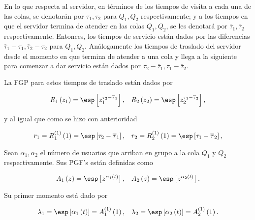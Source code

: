 En lo que respecta al servidor, en t\'erminos de los tiempos de
visita a cada una de las colas, se denotar\'an por
$\tau_{1},\tau_{2}$ para $Q_{1},Q_{2}$ respectivamente; y a los
tiempos en que el servidor termina de atender en las colas
$Q_{1},Q_{2}$, se les denotar\'a por
$\overline{\tau}_{1},\overline{\tau}_{2}$ respectivamente.
Entonces, los tiempos de servicio est\'an dados por las
diferencias
$\overline{\tau}_{1}-\tau_{1},\overline{\tau}_{2}-\tau_{2}$ para
$Q_{1},Q_{2}$. An\'alogamente los tiempos de traslado del servidor
desde el momento en que termina de atender a una cola y llega a la
siguiente para comenzar a dar servicio est\'an dados por
$\tau_{2}-\overline{\tau}_{1},\tau_{1}-\overline{\tau}_{2}$.


La FGP para estos tiempos de traslado est\'an dados por

\begin{eqnarray*}
\begin{array}{cc}
R_{1}\left(z_{1}\right)=\esp\left[z_{1}^{\tau_{2}-\overline{\tau}_{1}}\right],
&
R_{2}\left(z_{2}\right)=\esp\left[z_{2}^{\tau_{1}-\overline{\tau}_{2}}\right],
\end{array}
\end{eqnarray*}

y al igual que como se hizo con anterioridad

\begin{eqnarray*}
\begin{array}{cc}
r_{1}=R_{1}^{(1)}\left(1\right)=\esp\left[\tau_{2}-\overline{\tau}_{1}\right],
&
r_{2}=R_{2}^{(1)}\left(1\right)=\esp\left[\tau_{1}-\overline{\tau}_{2}\right],\\
\end{array}
\end{eqnarray*}


Sean $\alpha_{1},\alpha_{2}$ el n\'umero de usuarios que arriban
en grupo a la cola $Q_{1}$ y $Q_{2}$ respectivamente. Sus PGF's
est\'an definidas como

\begin{eqnarray*}
\begin{array}{cc}
A_{1}\left(z\right)=\esp\left[z^{\alpha_{1}\left(t\right)}\right],&
A_{2}\left(z\right)=\esp\left[z^{\alpha_{2}\left(t\right)}\right].\\
\end{array}
\end{eqnarray*}

Su primer momento est\'a dado por

\begin{eqnarray*}
\begin{array}{cc}
\lambda_{1}=\esp\left[\alpha_{1}\left(t\right)\right]=A_{1}^{(1)}\left(1\right),&
\lambda_{2}=\esp\left[\alpha_{2}\left(t\right)\right]=A_{2}^{(1)}\left(1\right).\\
\end{array}
\end{eqnarray*}


